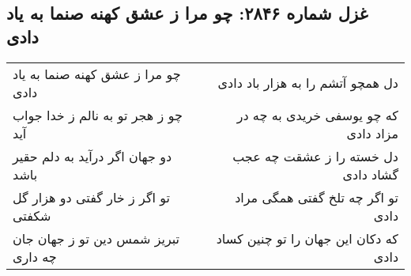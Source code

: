 \begin{center}
\section*{غزل شماره ۲۸۴۶: چو مرا ز عشق کهنه صنما به یاد دادی}
\label{sec:2846}
\begin{longtable}{l p{0.5cm} r}
چو مرا ز عشق کهنه صنما به یاد دادی
&&
دل همچو آتشم را به هزار باد دادی
\\
چو ز هجر تو به نالم ز خدا جواب آید
&&
که چو یوسفی خریدی به چه در مزاد دادی
\\
دو جهان اگر درآید به دلم حقیر باشد
&&
دل خسته را ز عشقت چه عجب گشاد دادی
\\
تو اگر ز خار گفتی دو هزار گل شکفتی
&&
تو اگر چه تلخ گفتی همگی مراد دادی
\\
تبریز شمس دین تو ز جهان جان چه داری
&&
که دکان این جهان را تو چنین کساد دادی
\\
\end{longtable}
\end{center}
